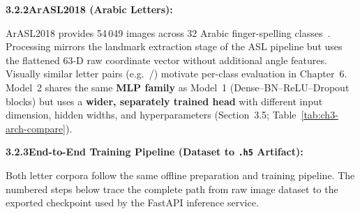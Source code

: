 \noindent\textbf{3.2.2\quad ArASL2018 (Arabic Letters):}\par
{}
\vspace{0.3cm}

\noindent ArASL2018 provides 54\,049 images across 32 Arabic finger-spelling classes~\cite{arthur2018arasl2018}. Processing mirrors the landmark extraction stage of the ASL pipeline but uses the flattened 63-D raw coordinate vector without additional angle features. Visually similar letter pairs (e.g.\ /) motivate per-class evaluation in Chapter~6. Model~2 shares the same \textbf{MLP family} as Model~1 (Dense--BN--ReLU--Dropout blocks) but uses a \textbf{wider, separately trained head} with different input dimension, hidden widths, and hyperparameters (Section~3.5; Table~\ref{tab:ch3-arch-compare}).\par\vspace{0.4cm}

\noindent\textbf{3.2.3\quad End-to-End Training Pipeline (Dataset to \texttt{.h5} Artifact):}\par
{}
\vspace{0.3cm}

\noindent Both letter corpora follow the same offline preparation and training pipeline. The numbered steps below trace the complete path from raw image dataset to the exported checkpoint used by the FastAPI inference service.


